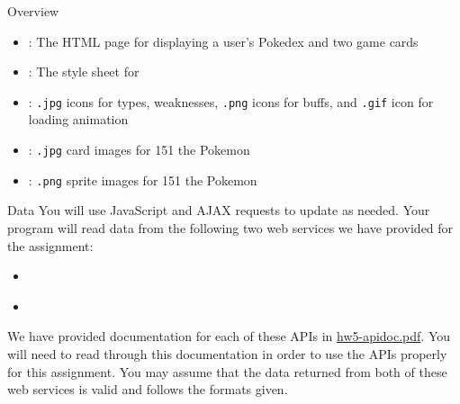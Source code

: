 \documentclass[programming]{../../../../mfcs}
\begin{document}
\begin{question}{Overview}
\begin{itemize}
  \item \texttt{\textbf{\color{colour}{pokedex.html}}}: The HTML page for displaying a user's Pokedex and two game cards
\item \texttt{\textbf{\color{colour}{pokedex.css}}}: The style sheet for
  \texttt{\textbf{\color{colour}{pokedex.html}}}
\item \texttt{\textbf{\color{colour}{icons/}}}: \texttt{.jpg} icons for types, weaknesses,
  \texttt{.png} icons for buffs, and \texttt{.gif} icon for loading animation
\item \texttt{\textbf{\color{colour}{images/}}}: \texttt{.jpg} card images for 151 the Pokemon
\item \texttt{\textbf{\color{colour}{sprites/}}}: \texttt{.png} sprite images for 151 the Pokemon
\end{itemize}
\newline

\end{question}
\newpage
\begin{question}{Data}
  You will use JavaScript and AJAX requests to update \texttt{\textbf{\color{colour}{pokedex.html}}} as needed. Your program will
read data from the following two web services we have provided for the assignment:

\begin{itemize}
  \item \texttt{\textbf{\color{colour}{https://webster.cs.washington.edu/pokedex/pokedex.php}}}
  \item \texttt{\textbf{\color{colour}{https://webster.cs.washington.edu/pokedex/game.php}}}
\end{itemize}

We have provided documentation for each of these APIs in \url{hw5-apidoc.pdf}. You will need to
read through this documentation in order to use the APIs properly for this assignment. 
You may assume that the data returned from both of these web services is valid and follows the
formats given.
\newline
\end{question}
\end{document}
